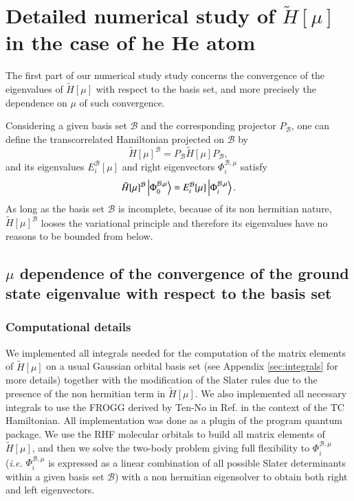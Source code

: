 \documentclass[aip,jcp,reprint,noshowkeys,superscriptaddress]{revtex4-1}
\newcommand{\phimub}[0]{\Phi^{\mathcal{B},\mu}_0}
\newcommand{\phiimub}[0]{\Phi^{\mathcal{B},\mu}_i}
\newcommand{\basis}[0]{\mathcal{B}}
\begin{document}
\section{Detailed numerical study of $\tilde{H}[\mu]$ in the case of he He atom}
\label{sec:total_he}
The first part of our numerical study study concerns the convergence of the eigenvalues of $\tilde{H}[\mu]$ with respect to the basis set, and more precisely the dependence on $\mu$ of such convergence. 

Considering a given basis set $\basis$ and the corresponding projector $P_\basis$, one can define the transcorrelated Hamiltonian projected on $\basis$ by
\begin{equation}
 \tilde{H}[\mu]^{\basis} = P_\basis \tilde{H}[\mu] P_\basis,
\end{equation}
and its eigenvalues $E_i^{\basis}[\mu]$ and right eigenvectors $\phiimub$ satisfy 
\begin{equation}
 \tilde{H}[\mu]^{\basis} \ket{\phimub} = E_i^{\basis}[\mu] \ket{\phiimub}. 
\end{equation}
As long as the basis set $\basis$ is incomplete, because of its non hermitian nature, $\tilde{H}[\mu]^{\basis}$ looses the variational principle and therefore its eigenvalues have no reasons to be bounded from below.  

\subsection{$\mu$ dependence of the convergence of the ground state eigenvalue with respect to the basis set }
\subsubsection{Computational details}
We implemented all integrals needed for the computation of the matrix elements of $\tilde{H}[\mu]$ on a usual Gaussian orbital basis set (see Appendix \ref{sec:integrals} for more details) together with the modification of the Slater rules due to the presence of the non hermitian term in $\tilde{H}[\mu]$. We also implemented all necessary integrals to use the FROGG derived by Ten-No in Ref.  in the context of the TC Hamiltonian.  
All implementation was done as a plugin of the program quantum package\cite{QP2}. 
We use the RHF molecular orbitals to build all matrix elements of $\tilde{H}[\mu]$, and then we solve the two-body problem giving full flexibility to $\phiimub$ (\textit{i.e.} $\phiimub$ is expressed as a linear combination of all possible Slater determinants within a given basis set $\basis$) with a non hermitian eigensolver to obtain both right and left eigenvectors. 
\end{document}

